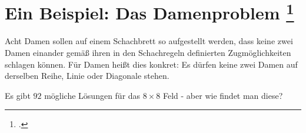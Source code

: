 \documentclass{lehramt-informatik-aufgabe}
\begin{document}

\section{Ein Beispiel: Das Damenproblem
\footcite[Seite 18 - 19 (PDF 15-19)]{aud:fs:3}}

Acht Damen sollen auf einem Schachbrett so aufgestellt werden, dass
keine zwei Damen einander gemäß ihren in den Schachregeln definierten
Zugmöglichkeiten schlagen können. Für Damen heißt dies konkret: Es
dürfen keine zwei Damen auf derselben Reihe, Linie oder Diagonale
stehen.

Es gibt $92$ mögliche Lösungen für das $8 \times 8$ Feld - aber wie findet man
diese?

\end{document}
